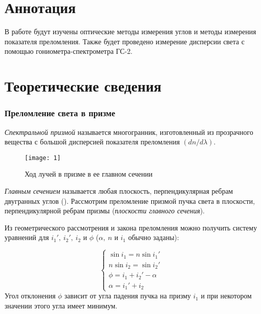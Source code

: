 \documentclass[a4paper, 12pt]{article}
\begin{document}

\section{Аннотация}
В работе будут изучены оптические методы измерения углов и методы
измерения показателя преломления. Также будет проведено измерение
дисперсии света с помощью гониометра-спектрометра ГС-2.

\section{Теоретические сведения}
\subsubsection*{Преломление света в призме}
\textit{Спектральной призмой} называется многогранник, изготовленный
из прозрачного вещества с большой дисперсией показателя преломления
$(dn/d\lambda)$.

\begin{figure}[H]
    \texttt{[image: 1]} 
    \caption{Ход лучей в призме в ее главном сечении}
    \label{fig:1}
\end{figure}

\textit{Главным сечением} называется любая плоскость, перпендикулярная
ребрам двугранных углов (). Рассмотрим преломление призмой
пучка света в плоскости, перпендикулярной ребрам призмы
(\textit{плоскости главного сечения}). 

Из геометрического рассмотрения и закона преломления можно получить
систему уравнений для $i_1',\ i_2',\ i_2$ и $\phi$ ($\alpha,\ n$ и
$i_1$ обычно заданы):

\begin{equation}
    \left\{
       \begin{gathered}
           \sin i_1 = n \sin i_1' \\
           n\sin i_2 = \sin i_2' \\
           \phi = i_1 + i_2' - \alpha \\
           \alpha = i_1'+i_2
       \end{gathered}
    \right.
    \label{eq:1}
\end{equation}
Угол отклонения $\phi$ зависит от угла падения пучка на призму $i_1$ и
при некотором значении этого угла имеет минимум.
\end{document}
